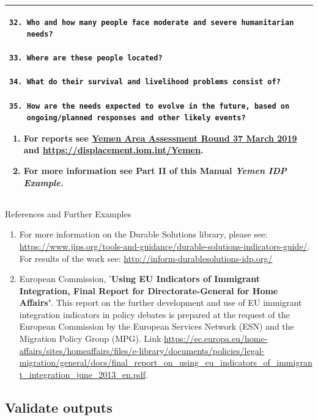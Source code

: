\documentclass[
]{article}
\begin{document}
\begin{longtable}[]{@{}l@{}}
\begin{minipage}[t]{0.97\columnwidth}
\begin{verbatim}
32. Who and how many people face moderate and severe humanitarian
    needs?

33. Where are these people located?

34. What do their survival and livelihood problems consist of?

35. How are the needs expected to evolve in the future, based on
    ongoing/planned responses and other likely events?
\end{verbatim}

\begin{enumerate}
\def\labelenumi{\arabic{enumi}.}
\setcounter{enumi}{455}
\item
  For reports see \href{https://displacement.iom.int/system/tdf/reports/Yemen\%20Are\%20a\%20Assessment\%20Round\%2037.pdf?file=1\&type=node\&id=5295}{Yemen Area Assessment Round 37 March
  2019}
  and \url{https://displacement.iom.int/Yemen}.
\item
  For more information see Part II of this Manual \emph{Yemen IDP
  Example.}
\end{enumerate}\strut
\end{minipage}\tabularnewline
\bottomrule
\end{longtable}

References and Further Examples

\begin{enumerate}
\def\labelenumi{\arabic{enumi}.}
\setcounter{enumi}{457}
\item
  For more information on the Durable Solutions library, please see:
  \url{https://www.jips.org/tools-and-guidance/durable-solutions-indicators-guide/}.
  For results of the work see:
  \url{http://inform-durablesolutions-idp.org/}
\item
  European Commission, '\textbf{Using EU Indicators of Immigrant
  Integration, Final Report for Directorate-General for Home
  Affairs'}. This report on the further development and use of EU
  immigrant integration indicators in policy debates is prepared at
  the request of the European Commission by the European Services
  Network (ESN) and the Migration Policy Group (MPG). Link
  \url{https://ec.europa.eu/home-affairs/sites/homeaffairs/files/e-library/documents/policies/legal-migration/general/docs/final_report_on_using_eu_indicators_of_immigrant_integration_june_2013_en.pdf}.
\end{enumerate}

\hypertarget{validate-outputs-1}{%
\subsection{Validate outputs}\label{validate-outputs-1}}
\end{document}
